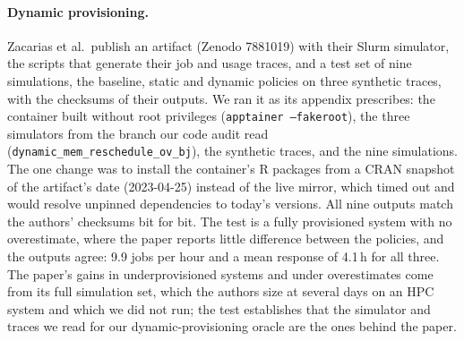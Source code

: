 \documentclass[11pt]{article}
\begin{document}
\paragraph{Dynamic provisioning.} Zacarias et al.\ publish an artifact (Zenodo 7881019) with their Slurm simulator, the
scripts that generate their job and usage traces, and a test set of nine simulations, the baseline, static and dynamic
policies on three synthetic traces, with the checksums of their outputs. We ran it as its appendix prescribes: the
container built without root privileges (\texttt{apptainer --fakeroot}), the three simulators from the branch our code
audit read (\texttt{dynamic\_mem\_reschedule\_ov\_bj}), the synthetic traces, and the nine simulations. The one change was
to install the container's R packages from a CRAN snapshot of the artifact's date (2023-04-25) instead of the live mirror,
which timed out and would resolve unpinned dependencies to today's versions. All nine outputs match the authors'
checksums bit for bit. The test is a fully provisioned system with no overestimate, where the paper reports little
difference between the policies, and the outputs agree: 9.9 jobs per hour and a mean response of 4.1\,h for all three. The
paper's gains in underprovisioned systems and under overestimates come from its full simulation set, which the authors
size at several days on an HPC system and which we did not run; the test establishes that the simulator and traces we
read for our dynamic-provisioning oracle are the ones behind the paper.

\clearpage


\end{document}

